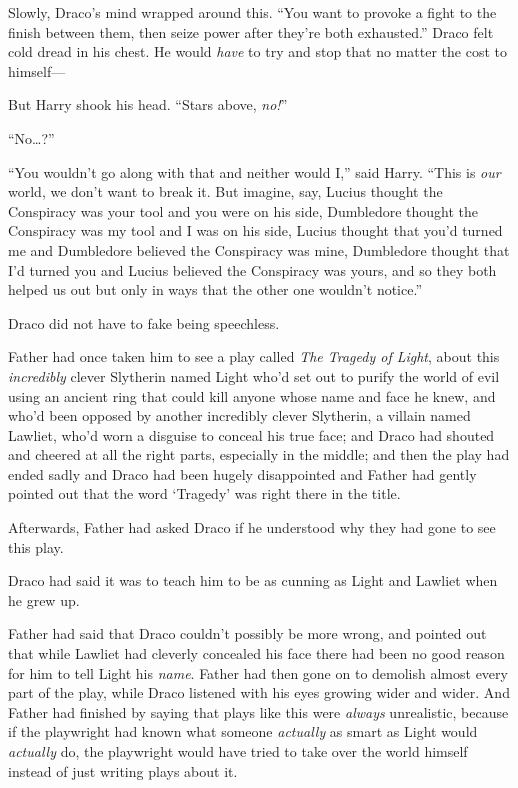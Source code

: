 Slowly, Draco’s mind wrapped around this. “You want to provoke a fight to the finish between them, then seize power after they’re both exhausted.” Draco felt cold dread in his chest. He would \emph{have} to try and stop that no matter the cost to himself—

But Harry shook his head. “Stars above, \emph{no!}”

“No…?”

“You wouldn’t go along with that and neither would I,” said Harry. “This is \emph{our} world, we don’t want to break it. But imagine, say, Lucius thought the Conspiracy was your tool and you were on his side, Dumbledore thought the Conspiracy was my tool and I was on his side, Lucius thought that you’d turned me and Dumbledore believed the Conspiracy was mine, Dumbledore thought that I’d turned you and Lucius believed the Conspiracy was yours, and so they both helped us out but only in ways that the other one wouldn’t notice.”

Draco did not have to fake being speechless.

Father had once taken him to see a play called \emph{The Tragedy of Light}, about this \emph{incredibly} clever Slytherin named Light who’d set out to purify the world of evil using an ancient ring that could kill anyone whose name and face he knew, and who’d been opposed by another incredibly clever Slytherin, a villain named Lawliet, who’d worn a disguise to conceal his true face; and Draco had shouted and cheered at all the right parts, especially in the middle; and then the play had ended sadly and Draco had been hugely disappointed and Father had gently pointed out that the word ‘Tragedy’ was right there in the title.

Afterwards, Father had asked Draco if he understood why they had gone to see this play.

Draco had said it was to teach him to be as cunning as Light and Lawliet when he grew up.

Father had said that Draco couldn’t possibly be more wrong, and pointed out that while Lawliet had cleverly concealed his face there had been no good reason for him to tell Light his \emph{name}. Father had then gone on to demolish almost every part of the play, while Draco listened with his eyes growing wider and wider. And Father had finished by saying that plays like this were \emph{always} unrealistic, because if the playwright had known what someone \emph{actually} as smart as Light would \emph{actually} do, the playwright would have tried to take over the world himself instead of just writing plays about it.

